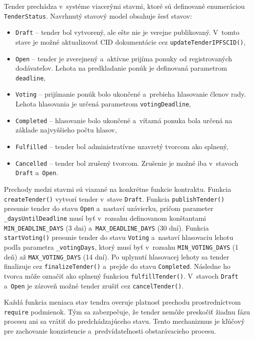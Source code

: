 Tender prechádza v~systéme viacerými stavmi, ktoré sú definované enumeráciou
\texttt{TenderStatus}. Navrhnutý stavový model obsahuje šesť stavov:
\begin{itemize}
    \item \texttt{Draft} -- tender bol vytvorený, ale ešte nie je verejne
    publikovaný. V~tomto stave je možné aktualizovať CID dokumentácie cez
    \texttt{updateTenderIPFSCID()},
    \item \texttt{Open} -- tender je zverejnený a~aktívne prijíma ponuky od
    registrovaných dodávateľov. Lehota na predkladanie ponúk je definovaná
    parametrom \texttt{deadline},
    \item \texttt{Voting} -- prijímanie ponúk bolo ukončené a~prebieha
    hlasovanie členov rady. Lehota hlasovania je určená parametrom
    \texttt{votingDeadline},
    \item \texttt{Completed} -- hlasovanie bolo ukončené a~víťazná ponuka
    bola určená na základe najvyššieho počtu hlasov,
    \item \texttt{Fulfilled} -- tender bol administratívne uzavretý
    tvorcom ako splnený,
    \item \texttt{Cancelled} -- tender bol zrušený tvorcom. Zrušenie je
    možné iba v~stavoch \texttt{Draft} a~\texttt{Open}.
\end{itemize}

Prechody medzi stavmi sú viazané na konkrétne funkcie kontraktu. Funkcia
\texttt{createTender()} vytvorí tender v~stave \texttt{Draft}. Funkcia
\texttt{publishTender()} presunie tender do stavu \texttt{Open} a~nastaví
uzávierku, pričom parameter \texttt{\_daysUntilDeadline} musí byť
v~rozsahu definovanom konštantami \texttt{MIN\_DEADLINE\_DAYS} (3 dni)
a~\texttt{MAX\_DEADLINE\_DAYS} (30 dní). Funkcia \texttt{startVoting()}
presunie tender do stavu \texttt{Voting} a~nastaví hlasovaciu lehotu
podľa parametra \texttt{\_votingDays}, ktorý musí byť v~rozsahu
\texttt{MIN\_VOTING\_DAYS} (1 deň) až \texttt{MAX\_VOTING\_DAYS}
(14 dní). Po uplynutí hlasovacej lehoty sa tender finalizuje cez
\texttt{finalizeTender()} a~prejde do stavu \texttt{Completed}. Následne
ho tvorca môže označiť ako splnený funkciou \texttt{fulfillTender()}.
V~stavoch \texttt{Draft} a~\texttt{Open} je zároveň možné tender zrušiť
cez \texttt{cancelTender()}.

Každá funkcia meniaca stav tendra overuje platnosť prechodu
prostredníctvom \texttt{require} podmienok. Tým sa zabezpečuje, že tender
nemôže preskočiť žiadnu fázu procesu ani sa vrátiť do predchádzajúceho
stavu. Tento mechanizmus je kľúčový pre zachovanie konzistencie
a~predvídateľnosti obstarávacieho procesu.


